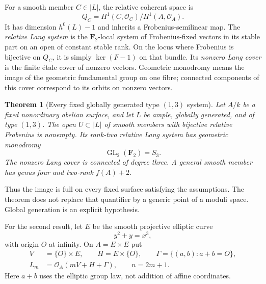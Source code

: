 \documentclass[11pt]{article}
\newtheorem{theorem}{Theorem}[section]
\theoremstyle{remark}\newtheorem{remark}[theorem]{Remark}
\newcommand{\OO}{\mathcal O}
\newcommand{\FF}{\mathbf F}
\newcommand{\GL}{\operatorname{GL}}
\begin{document}
For a smooth member $C\in|L|$, the relative coherent space is
\[
 Q_C=H^1(C,\OO_C)/H^1(A,\OO_A).
\]
It has dimension $h^0(L)-1$ and inherits a Frobenius-semilinear map. The \emph{relative Lang system} is the $\FF_2$-local system of Frobenius-fixed vectors in its stable part on an open of constant stable rank. On the locus where Frobenius is bijective on $Q_C$, it is simply $\ker(F-1)$ on that bundle. Its \emph{nonzero Lang cover} is the finite \'etale cover of nonzero vectors. Geometric monodromy means the image of the geometric fundamental group on one fibre; connected components of this cover correspond to its orbits on nonzero vectors.

\begin{theorem}[Every fixed globally generated type $(1,3)$ system]\label{thm:three}
Let $A/k$ be a fixed nonordinary abelian surface, and let $L$ be ample, globally generated, and of type $(1,3)$. The open $U\subset|L|$ of smooth members with bijective relative Frobenius is nonempty. Its rank-two relative Lang system has geometric monodromy
\[
                         \GL_2(\FF_2)=S_3.
\]
The nonzero Lang cover is connected of degree three. A general smooth member has genus four and two-rank $f(A)+2$.
\end{theorem}

Thus the image is full on every fixed surface satisfying the assumptions. The theorem does not replace that quantifier by a generic point of a moduli space. Global generation is an explicit hypothesis.

For the second result, let $E$ be the smooth projective elliptic curve
\[
                         y^2+y=x^3,
\]
with origin $O$ at infinity. On $A=E\times E$ put
\begin{equation}\label{eq:lines}
 \begin{split}
 V&=\{O\}\times E,\qquad H=E\times\{O\},\qquad
 \Gamma=\{(a,b):a+b=O\},\\
 L_m&=\OO_A(mV+H+\Gamma),\qquad n=2m+1.
 \end{split}
\end{equation}
Here $a+b$ uses the elliptic group law, not addition of affine coordinates.
\end{document}
